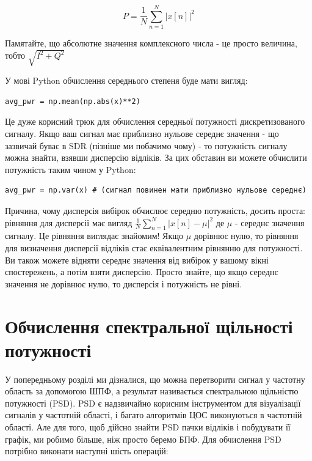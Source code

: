 \[P = \frac{1}{N} \sum_{n=1}^{N} |x[n]|^2\]

Пам\textquotesingle ятайте, що абсолютне значення комплексного числа -
це просто величина, тобто \(\sqrt{I^2+Q^2}\)

У мові Python обчислення середнього степеня буде мати вигляд:

\begin{Verbatim}[breaklines=true,breakanywhere=true,fontsize=\small]
avg_pwr = np.mean(np.abs(x)**2)
\end{Verbatim}

Це дуже корисний трюк для обчислення середньої потужності
дискретизованого сигналу. Якщо ваш сигнал має приблизно нульове середнє
значення - що зазвичай буває в SDR (пізніше ми побачимо чому) - то
потужність сигналу можна знайти, взявши дисперсію відліків. За цих
обставин ви можете обчислити потужність таким чином у Python:

\begin{Verbatim}[breaklines=true,breakanywhere=true,fontsize=\small]
avg_pwr = np.var(x) # (сигнал повинен мати приблизно нульове середнє)
\end{Verbatim}

Причина, чому дисперсія вибірок обчислює середню потужність, досить
проста: рівняння для дисперсії має вигляд
\(\frac{1}{N}\sum^N_{n=1} |x[n]-\mu|^2\) де \(\mu\) - середнє значення
сигналу. Це рівняння виглядає знайомим! Якщо \(\mu\) дорівнює нулю, то
рівняння для визначення дисперсії відліків стає еквівалентним рівнянню
для потужності. Ви також можете відняти середнє значення від вибірок у
вашому вікні спостережень, а потім взяти дисперсію. Просто знайте, що
якщо середнє значення не дорівнює нулю, то дисперсія і потужність не
рівні.

\section{Обчислення спектральної щільності
потужності}\label{ux43eux431ux447ux438ux441ux43bux435ux43dux43dux44f-ux441ux43fux435ux43aux442ux440ux430ux43bux44cux43dux43eux457-ux449ux456ux43bux44cux43dux43eux441ux442ux456-ux43fux43eux442ux443ux436ux43dux43eux441ux442ux456}

У попередньому розділі ми дізналися, що можна перетворити сигнал у
частотну область за допомогою ШПФ, а результат називається спектральною
щільністю потужності (PSD). PSD є надзвичайно корисним інструментом для
візуалізації сигналів у частотній області, і багато алгоритмів ЦОС
виконуються в частотній області. Але для того, щоб дійсно знайти PSD
пачки відліків і побудувати її графік, ми робимо більше, ніж просто
беремо БПФ. Для обчислення PSD потрібно виконати наступні шість
операцій:

